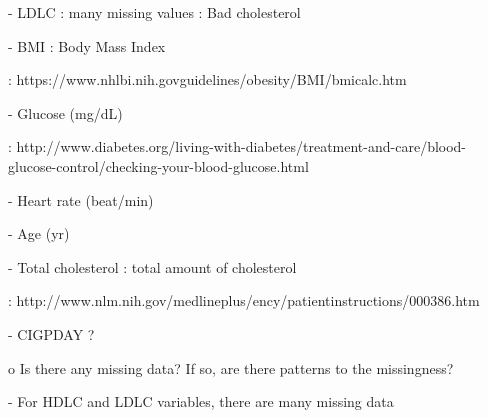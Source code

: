 \documentclass{article}
\begin{document}
- LDLC : many missing values 
: Bad cholesterol

- BMI : Body Mass Index 

: https://www.nhlbi.nih.govguidelines/obesity/BMI/bmicalc.htm
  
- Glucose (mg/dL)

: http://www.diabetes.org/living-with-diabetes/treatment-and-care/blood-glucose-control/checking-your-blood-glucose.html

- Heart rate (beat/min)

- Age (yr)

- Total cholesterol : total amount of cholesterol

: http://www.nlm.nih.gov/medlineplus/ency/patientinstructions/000386.htm

- CIGPDAY ?


o	Is there any missing data? If so, are there patterns to the missingness?

    - For HDLC and LDLC variables, there are many missing data 
    
\end{document}
